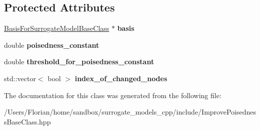 \subsection*{Protected Attributes}
\begin{DoxyCompactItemize}
\item 
\hyperlink{class_basis_for_surrogate_model_base_class}{Basis\+For\+Surrogate\+Model\+Base\+Class} $\ast$ {\bfseries basis}\hypertarget{class_improve_poisedness_base_class_a5d271d53b0a870301eaaac149d0b4fd5}{}\label{class_improve_poisedness_base_class_a5d271d53b0a870301eaaac149d0b4fd5}

\item 
double {\bfseries poisedness\+\_\+constant}\hypertarget{class_improve_poisedness_base_class_a70f430cec7e08d9734a4a7cd76305d1d}{}\label{class_improve_poisedness_base_class_a70f430cec7e08d9734a4a7cd76305d1d}

\item 
double {\bfseries threshold\+\_\+for\+\_\+poisedness\+\_\+constant}\hypertarget{class_improve_poisedness_base_class_a13b50f70a6776efd888f60edbee972d8}{}\label{class_improve_poisedness_base_class_a13b50f70a6776efd888f60edbee972d8}

\item 
std\+::vector$<$ bool $>$ {\bfseries index\+\_\+of\+\_\+changed\+\_\+nodes}\hypertarget{class_improve_poisedness_base_class_aa5a959608ad79821fc08172729017edb}{}\label{class_improve_poisedness_base_class_aa5a959608ad79821fc08172729017edb}

\end{DoxyCompactItemize}


The documentation for this class was generated from the following file\+:\begin{DoxyCompactItemize}
\item 
/\+Users/\+Florian/home/sandbox/surrogate\+\_\+models\+\_\+cpp/include/Improve\+Poisedness\+Base\+Class.\+hpp\end{DoxyCompactItemize}
